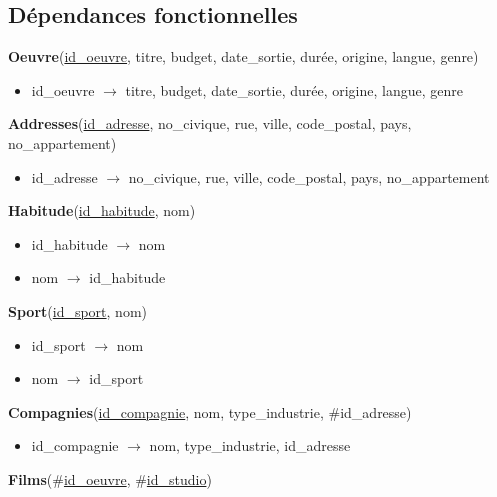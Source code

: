 \documentclass{article}
\begin{document}
\newpage
\subsection{Dépendances fonctionnelles}


\textbf{Oeuvre}(\underline{id\_oeuvre}, titre, budget, date\_sortie,
durée, origine, langue, genre)

\begin{itemize}
\item id\_oeuvre $\rightarrow$ titre, budget, date\_sortie, durée,
  origine, langue, genre
\end{itemize}

\vspace{2mm}
\noindent
\textbf{Addresses}(\underline{id\_adresse}, no\_civique, rue, ville, code\_postal, pays, no\_appartement)

\begin{itemize}
\item id\_adresse $\rightarrow$ no\_civique, rue, ville, code\_postal, pays, no\_appartement
\end{itemize}

\vspace{2mm}
\noindent
\textbf{Habitude}(\underline{id\_habitude}, nom)

\begin{itemize}
\item id\_habitude $\rightarrow$ nom
\item nom $\rightarrow$ id\_habitude
\end{itemize}

\vspace{2mm}
\noindent
\textbf{Sport}(\underline{id\_sport}, nom)

\begin{itemize}
\item id\_sport $\rightarrow$ nom
\item nom $\rightarrow$ id\_sport
\end{itemize}

\vspace{2mm}
\noindent
\textbf{Compagnies}(\underline{id\_compagnie}, nom, type\_industrie, \#id\_adresse)

\begin{itemize}
\item id\_compagnie $\rightarrow$ nom, type\_industrie, id\_adresse
\end{itemize}

\vspace{2mm}
\noindent
\textbf{Films}(\#\underline{id\_oeuvre}, \#\underline{id\_studio})
\end{document}
